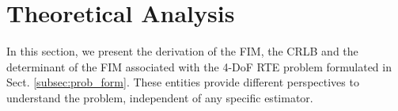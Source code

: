 \documentclass[journal]{IEEEtran}
\newcommand{\norm}[1]{\left\lVert#1\right\rVert}
\begin{document}


\section{Theoretical Analysis} \label{sec:TheorecticalAnalysis}

In this section, we present the derivation of the FIM, the CRLB and the determinant of the FIM associated with the 4-DoF RTE problem formulated in Sect. \ref{subsec:prob_form}. These entities provide different perspectives to understand the problem, independent of any specific estimator.

\end{document}
